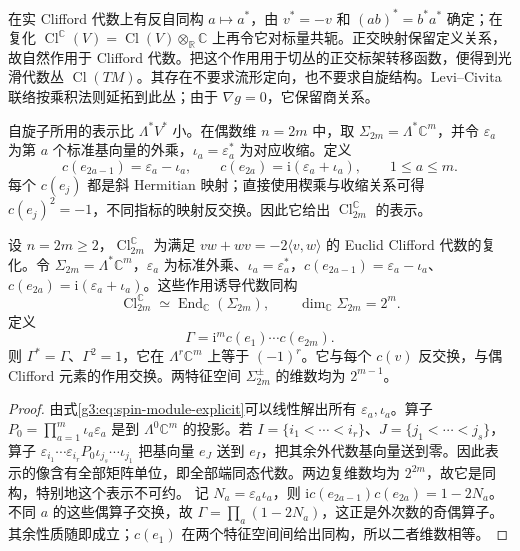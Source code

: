 在实 Clifford 代数上有反自同构 \(a\mapsto a^*\)，由 \(v^*=-v\) 和 \((ab)^*=b^*a^*\) 确定；在复化 \(\operatorname{Cl}^{\mathbb C}(V)=\operatorname{Cl}(V)\otimes_{\mathbb R}\mathbb C\) 上再令它对标量共轭。正交映射保留定义关系，故自然作用于 Clifford 代数。把这个作用用于切丛的正交标架转移函数，便得到光滑代数丛 \(\operatorname{Cl}(TM)\)。其存在不要求流形定向，也不要求自旋结构。Levi--Civita 联络按乘积法则延拓到此丛；由于 \(\nabla g=0\)，它保留商关系。

\ProseParagraphBreak

自旋子所用的表示比 \(\Lambda^*V^*\) 小。在偶数维 \(n=2m\) 中，取
\(\Sigma_{2m}=\Lambda^*\mathbb C^m\)，并令 \(\varepsilon_a\) 为第 \(a\) 个标准基向量的外乘，\(\iota_a=\varepsilon_a^*\) 为对应收缩。定义
\begin{equation}\label{g3:eq:spin-module-explicit}
	c(e_{2a-1})=\varepsilon_a-\iota_a,
	\qquad c(e_{2a})=\mathrm i(\varepsilon_a+\iota_a),
	\qquad 1\le a\le m.
\end{equation}
每个 \(c(e_j)\) 都是斜 Hermitian 映射；直接使用楔乘与收缩关系可得 \(c(e_j)^2=-1\)，不同指标的映射反交换。因此它给出 \(\operatorname{Cl}_{2m}^{\mathbb C}\) 的表示。

\begin{proposition}\label{g3:prop:complex-spin-module}
	设 \(n=2m\ge2\)，\(\operatorname{Cl}_{2m}^{\mathbb C}\) 为满足 \(vw+wv=-2\langle v,w\rangle\) 的 Euclid Clifford 代数的复化。令 \(\Sigma_{2m}=\Lambda^*\mathbb C^m\)，\(\varepsilon_a\) 为标准外乘、\(\iota_a=\varepsilon_a^*\)，\(c(e_{2a-1})=\varepsilon_a-\iota_a\)、\(c(e_{2a})=\mathrm i(\varepsilon_a+\iota_a)\)。这些作用诱导代数同构
	\[
		\operatorname{Cl}_{2m}^{\mathbb C}\simeq\operatorname{End}_{\mathbb C}(\Sigma_{2m}),
		\qquad \dim_{\mathbb C}\Sigma_{2m}=2^m.
	\]
	定义
	\begin{equation}\label{g3:eq:spin-chirality}
		\Gamma=\mathrm i^m c(e_1)\cdots c(e_{2m}).
	\end{equation}
	则 \(\Gamma^*=\Gamma\)、\(\Gamma^2=1\)，它在 \(\Lambda^r\mathbb C^m\) 上等于 \((-1)^r\)。它与每个 \(c(v)\) 反交换，与偶 Clifford 元素的作用交换。两特征空间 \(\Sigma_{2m}^{\pm}\) 的维数均为 \(2^{m-1}\)。
\end{proposition}
\begin{proof}
	由式\eqref{g3:eq:spin-module-explicit}可以线性解出所有 \(\varepsilon_a,\iota_a\)。算子
	\(P_0=\prod_{a=1}^m\iota_a\varepsilon_a\)
	是到 \(\Lambda^0\mathbb C^m\) 的投影。若 \(I=\{i_1<\cdots<i_r\}\)、\(J=\{j_1<\cdots<j_s\}\)，算子
	\(\varepsilon_{i_1}\cdots\varepsilon_{i_r}P_0\iota_{j_s}\cdots\iota_{j_1}\)
	把基向量 \(e_J\) 送到 \(e_I\)，把其余外代数基向量送到零。因此表示的像含有全部矩阵单位，即全部端同态代数。两边复维数均为 \(2^{2m}\)，故它是同构，特别地这个表示不可约。
	记 \(N_a=\varepsilon_a\iota_a\)，则
	\(\mathrm i c(e_{2a-1})c(e_{2a})=1-2N_a\)。不同 \(a\) 的这些偶算子交换，故 \(\Gamma=\prod_a(1-2N_a)\)，这正是外次数的奇偶算子。其余性质随即成立；\(c(e_1)\) 在两个特征空间间给出同构，所以二者维数相等。
\end{proof}

